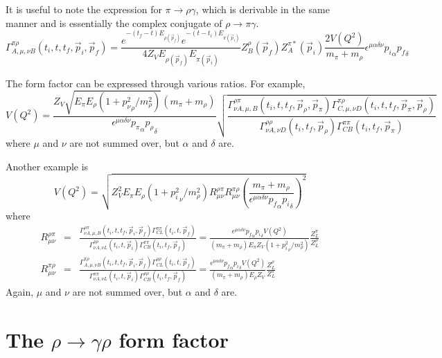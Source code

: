 \documentclass[12pt]{article}
\begin{document}
It is useful to note the expression for $\pi\to\rho\gamma$, which is
derivable in the same manner and is essentially the complex conjugate of
$\rho\to\pi\gamma$.
\[
\Gamma^{\pi\rho}_{A,\mu,\nu B}(t_i,t,t_f,\vec p_i,\vec p_f)
= \frac{e^{-(t_f-t)E_{\rho(\vec{p}_f)}}e^{-(t-t_i)E_{\pi(\vec{p}_i)}}}
   {4Z_V E_{\rho(\vec{p}_f)}E_{\pi(\vec{p}_i)}}
   Z_B^\rho(\vec p_f)Z_A^{\pi*}(\vec p_i)\frac{2V(Q^2)}{m_\pi
     +m_\rho}\epsilon^{\mu\alpha\delta\nu}{p_i}_\alpha{p_f}_\delta \nonumber
\]

The form factor can be expressed through various ratios.  For example,
\[
V(Q^2) = \frac{Z_V\sqrt{E_\pi E_\rho(1+{p_\nu^2}_\rho/m_\rho^2)}(m_\pi+m_\rho)}
         {\epsilon^{\mu\alpha\delta\nu}{p_\pi}_\alpha{p_\rho}_\delta}
         \sqrt{\frac{\Gamma^{\rho\pi}_{\nu A,\mu,B}(t_i,t,t_f,\vec p_\rho,
         \vec p_\pi)\Gamma^{\pi\rho}_{C,\mu,\nu D}(t_i,t,t_f,\vec p_\pi,
         \vec p_\rho)}{\Gamma^{\rho\rho}_{\nu A,\nu D}(t_i,t_f,\vec p_\rho)
         \Gamma^{\pi\pi}_{CB}(t_i,t_f,\vec p_\pi)}}
\]
where $\mu$ and $\nu$ are not summed over, but $\alpha$ and $\delta$ are.

Another example is
\[
V(Q^2) = \sqrt{Z_V^2E_\pi E_\rho(1+{p_i^2}_\nu/m_\rho^2)R^{\rho\pi}_{\mu\nu}
         R^{\pi\rho}_{\mu\nu}\left(\frac{m_\pi+m_\rho}{\epsilon^{\mu\alpha
         \delta\nu}{p_f}_\alpha{p_i}_\delta}\right)^2}
\]
where
\begin{eqnarray*}
R^{\rho\pi}_{\mu\nu} &=& \frac{\Gamma^{\rho\pi}_{\nu A,\mu,B}(t_i,t,t_f,
     \vec p_i,\vec p_f)\Gamma^{\pi\pi}_{CL}(t_i,t,\vec p_f)}
     {\Gamma^{\rho\rho}_{\nu A,\nu L}(t_i,t,\vec p_i)
     \Gamma^{\pi\pi}_{CB}(t_i,t_f,\vec p_f)}
  = \frac{\epsilon^{\mu\alpha\delta\nu}{p_f}_\alpha{p_i}_\delta V(Q^2)}
    {(m_\pi + m_\rho)E_\pi Z_V(1+{p_i^2}_\nu/m_\rho^2)}\frac{Z_L^\pi}{Z_L^\rho}
    \\
R^{\pi\rho}_{\mu\nu} &=& \frac{\Gamma^{\pi\rho}_{A,\mu,\nu B}(t_i,t,t_f,
     \vec p_i,\vec p_f)\Gamma^{\rho\rho}_{CL}(t_i,t,\vec p_f)}
     {\Gamma^{\pi\pi}_{\nu A,\nu L}(t_i,t,\vec p_i)
     \Gamma^{\rho\rho}_{CB}(t_i,t_f,\vec p_f)}
  = \frac{\epsilon^{\mu\alpha\delta\nu}{p_f}_\alpha{p_i}_\delta V(Q^2)}
    {(m_\pi + m_\rho)E_\rho Z_V}\frac{Z_L^\rho}{Z_L^\pi}
\end{eqnarray*}
Again, $\mu$ and $\nu$ are not summed over, but $\alpha$ and $\delta$ are.


\newpage

\section{The $\rho\rightarrow\gamma\rho$ form factor}
\end{document}
